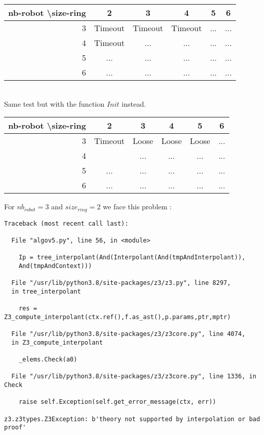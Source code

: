 \documentclass{article}
\begin{document}
\begin{tabular}{|r|c|c|c|c|c|}
  \hline
  nb-robot \textbackslash size-ring & 2 & 3 & 4 & 5 & 6\\
  \hline
  3 & Timeout & Timeout & Timeout & ... & ... \\
  \hline
  4 & Timeout & ... & ... & ... & ... \\
  \hline
  5 & ... & ... & ... & ... & ... \\
  \hline
  6 & ... & ... & ... & ... & ... \\
  \hline
\end{tabular}
\\

Same test but with the function $Init$ instead.\\

\begin{tabular}{|r|c|c|c|c|c|}
  \hline
  nb-robot \textbackslash size-ring & 2 & 3 & 4 & 5 & 6\\
  \hline
  3 & Timeout & Loose & Loose & Loose & ... \\
  \hline
  4 &  & ... & ... & ... & ... \\
  \hline
  5 & ... & ... & ... & ... & ... \\
  \hline
  6 & ... & ... & ... & ... & ... \\
  \hline
\end{tabular}

For $nb_{robot} = 3$ and $size_{ring} = 2$ we face this problem :
\begin{lstlisting}
Traceback (most recent call last):

  File "algov5.py", line 56, in <module>
  
    Ip = tree_interpolant(And(Interpolant(And(tmpAndInterpolant)), 
    And(tmpAndContext)))
    
  File "/usr/lib/python3.8/site-packages/z3/z3.py", line 8297, 
  in tree_interpolant
  
    res = Z3_compute_interpolant(ctx.ref(),f.as_ast(),p.params,ptr,mptr)
    
  File "/usr/lib/python3.8/site-packages/z3/z3core.py", line 4074, 
  in Z3_compute_interpolant
  
    _elems.Check(a0)
    
  File "/usr/lib/python3.8/site-packages/z3/z3core.py", line 1336, in Check
  
    raise self.Exception(self.get_error_message(ctx, err))
    
z3.z3types.Z3Exception: b'theory not supported by interpolation or bad proof'
\end{lstlisting}
\end{document}
